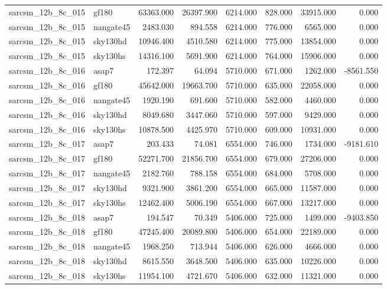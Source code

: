 \begin{tabular}{llrrrrrr}
sarcsm\_12b\_8c\_015 & gf180 & 63363.000 & 26397.900 & 6214.000 & 828.000 & 33915.000 & 0.000 \\
sarcsm\_12b\_8c\_015 & nangate45 & 2483.030 & 894.558 & 6214.000 & 776.000 & 6565.000 & 0.000 \\
sarcsm\_12b\_8c\_015 & sky130hd & 10946.400 & 4510.580 & 6214.000 & 775.000 & 13854.000 & 0.000 \\
sarcsm\_12b\_8c\_015 & sky130hs & 14316.100 & 5691.900 & 6214.000 & 764.000 & 15906.000 & 0.000 \\
sarcsm\_12b\_8c\_016 & asap7 & 172.397 & 64.094 & 5710.000 & 671.000 & 1262.000 & -8561.550 \\
sarcsm\_12b\_8c\_016 & gf180 & 45642.000 & 19663.700 & 5710.000 & 635.000 & 22058.000 & 0.000 \\
sarcsm\_12b\_8c\_016 & nangate45 & 1920.190 & 691.600 & 5710.000 & 582.000 & 4460.000 & 0.000 \\
sarcsm\_12b\_8c\_016 & sky130hd & 8049.680 & 3447.060 & 5710.000 & 597.000 & 9429.000 & 0.000 \\
sarcsm\_12b\_8c\_016 & sky130hs & 10878.500 & 4425.970 & 5710.000 & 609.000 & 10931.000 & 0.000 \\
sarcsm\_12b\_8c\_017 & asap7 & 203.433 & 74.081 & 6554.000 & 746.000 & 1734.000 & -9181.610 \\
sarcsm\_12b\_8c\_017 & gf180 & 52271.700 & 21856.700 & 6554.000 & 679.000 & 27206.000 & 0.000 \\
sarcsm\_12b\_8c\_017 & nangate45 & 2182.760 & 788.158 & 6554.000 & 684.000 & 5708.000 & 0.000 \\
sarcsm\_12b\_8c\_017 & sky130hd & 9321.900 & 3861.200 & 6554.000 & 665.000 & 11587.000 & 0.000 \\
sarcsm\_12b\_8c\_017 & sky130hs & 12462.400 & 5006.190 & 6554.000 & 667.000 & 13217.000 & 0.000 \\
sarcsm\_12b\_8c\_018 & asap7 & 194.547 & 70.349 & 5406.000 & 725.000 & 1499.000 & -9403.850 \\
sarcsm\_12b\_8c\_018 & gf180 & 47245.400 & 20089.800 & 5406.000 & 654.000 & 22189.000 & 0.000 \\
sarcsm\_12b\_8c\_018 & nangate45 & 1968.250 & 713.944 & 5406.000 & 626.000 & 4666.000 & 0.000 \\
sarcsm\_12b\_8c\_018 & sky130hd & 8615.550 & 3648.500 & 5406.000 & 635.000 & 10226.000 & 0.000 \\
sarcsm\_12b\_8c\_018 & sky130hs & 11954.100 & 4721.670 & 5406.000 & 632.000 & 11321.000 & 0.000 \\

\end{tabular}
